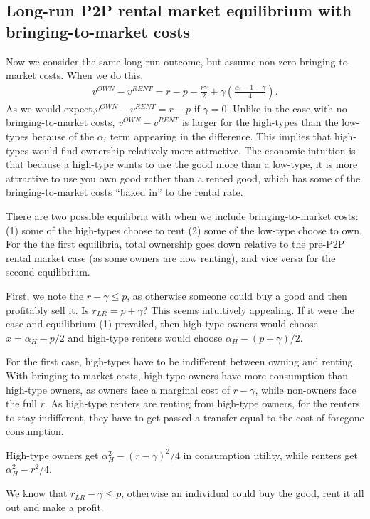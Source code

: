 \documentclass[11pt]{article}
\begin{document}
\subsection{Long-run P2P rental market equilibrium with bringing-to-market costs}
Now we consider the same long-run outcome, but assume non-zero bringing-to-market costs.
When we do this,
\begin{align}
  v^{OWN} - v^{RENT} = r - p - \frac{r\gamma}{2} + \gamma \left( \frac{\alpha_i - 1 - \gamma}{4} \right). 
\end{align}
As we would expect,$v^{OWN} - v^{RENT} = r - p$ if $\gamma = 0$. 
Unlike in the case with no bringing-to-market costs, $v^{OWN} - v^{RENT}$ is larger for the high-types than the low-types because of the $\alpha_i$ term appearing in the difference.
This implies that high-types would find ownership relatively more attractive.
The economic intuition is that because a high-type wants to use the good more than a low-type, it is more attractive to use you own good rather than a rented good, which has some of the bringing-to-market costs ``baked in'' to the rental rate. 

There are two possible equilibria with when we include bringing-to-market costs:
(1) some of the high-types choose to rent 
(2) some of the low-type choose to own. 
For the the first equilibria, total ownership goes down relative to the pre-P2P rental market case (as some owners are now renting), and vice versa for the second equilibrium. 

First, we note the $r - \gamma \le p$, as otherwise someone could buy a good and then profitably sell it.
Is $r_{LR} = p + \gamma$? 
This seems intuitively appealing.
If it were the case and equilibrium (1) prevailed, then high-type owners would choose $x = \alpha_H - p/2$ and high-type renters would choose $\alpha_H - (p + \gamma)/2$.

For the first case, high-types have to be indifferent between owning and renting.
With bringing-to-market costs, high-type owners have more consumption than high-type owners, as owners face a marginal cost of $r-\gamma$, while non-owners face the full $r$.
As high-type renters are renting from high-type owners, for the renters to stay indifferent, they have to get passed a transfer equal to the cost of foregone consumption.

High-type owners get $\alpha_H^2 - (r-\gamma)^2/4$ in consumption utility, while renters get $\alpha_H^2 - r^2/4$.

We know that $r_{LR} - \gamma \le p$, otherwise an individual could buy the good, rent it all out and make a profit. 
\end{document}
